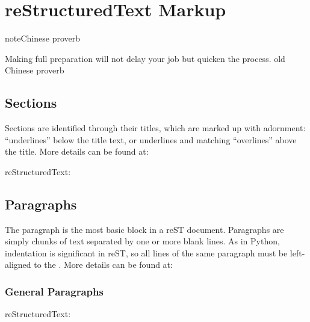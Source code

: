 \documentclass[letterpaper,12pt,english]{sphinxmanual}
\begin{document}
\chapter{reStructuredText Markup}
\label{\detokenize{rtxt:restructuredtext-markup}}\label{\detokenize{rtxt:rtext}}\label{\detokenize{rtxt::doc}}
\begin{sphinxadmonition}{note}{Chinese proverb}

Making full preparation will not delay your job but quicken the process. \textendash{} old Chinese proverb
\end{sphinxadmonition}


\section{Sections}
\label{\detokenize{rtxt:sections}}
Sections are identified through their titles, which are marked up with adornment: “underlines” below the title text, or underlines and matching “overlines” above the title. More details can be found at: 

reStructuredText:

\begin{sphinxVerbatim}[commandchars=\\\{\}]


\end{sphinxVerbatim}


\section{Paragraphs}
\label{\detokenize{rtxt:paragraphs}}
The paragraph is the most basic block in a reST document.
Paragraphs are simply chunks of text separated by one or
more blank lines. As in Python, indentation is significant
in reST, so all lines of the same paragraph must be
left-aligned to the . More
details can be found at: 


\subsection{General Paragraphs}
\label{\detokenize{rtxt:general-paragraphs}}
reStructuredText:
\end{document}
